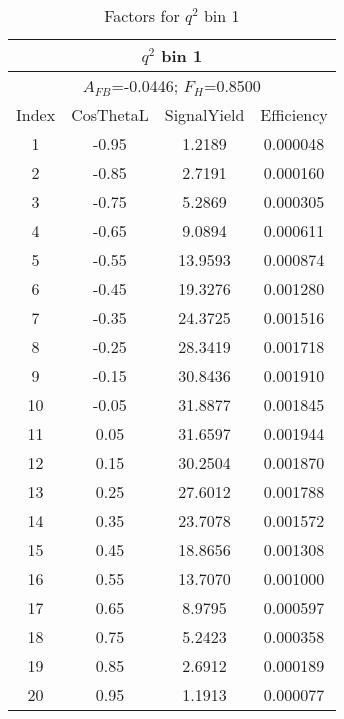 \begin{table*}[htbH]
  \begin{center}
  \caption{Factors for $q^2$ bin 1 
  \label{tab:factors_bin1}}
  \small
  \begin{tabular}{|c||c|c|c|}
    \hline
    \multicolumn{4}{|c|}{$q^2$ bin 1} \\ 
    \hline
    \multicolumn{4}{|c|}{$A_{FB}$=-0.0446;   $F_{H}$=0.8500} \\ 
    \hline
    Index & CosThetaL & SignalYield & Efficiency \\ 
    \hline
    1 & -0.95 & 1.2189 & 0.000048 \\ 
    2 & -0.85 & 2.7191 & 0.000160 \\ 
    3 & -0.75 & 5.2869 & 0.000305 \\ 
    4 & -0.65 & 9.0894 & 0.000611 \\ 
    5 & -0.55 & 13.9593 & 0.000874 \\ 
    6 & -0.45 & 19.3276 & 0.001280 \\ 
    7 & -0.35 & 24.3725 & 0.001516 \\ 
    8 & -0.25 & 28.3419 & 0.001718 \\ 
    9 & -0.15 & 30.8436 & 0.001910 \\ 
    10 & -0.05 & 31.8877 & 0.001845 \\ 
    11 & 0.05 & 31.6597 & 0.001944 \\ 
    12 & 0.15 & 30.2504 & 0.001870 \\ 
    13 & 0.25 & 27.6012 & 0.001788 \\ 
    14 & 0.35 & 23.7078 & 0.001572 \\ 
    15 & 0.45 & 18.8656 & 0.001308 \\ 
    16 & 0.55 & 13.7070 & 0.001000 \\ 
    17 & 0.65 & 8.9795 & 0.000597 \\ 
    18 & 0.75 & 5.2423 & 0.000358 \\ 
    19 & 0.85 & 2.6912 & 0.000189 \\ 
    20 & 0.95 & 1.1913 & 0.000077 \\ 
    \hline
  \end{tabular}
  \end{center}
\end{table*}


